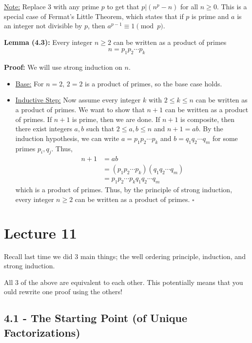 \documentclass{article}
\newcommand*{\qed}{\hfill$\square$}%
\begin{document}
\underline{Note:} Replace 3 with any prime $p$ to get that $p|(n^p-n)$ for all $n\geq 0$. This is a special case of Fermat's Little Theorem, which states that if $p$ is prime and $a$ is an integer not divisible by $p$, then $a^{p-1}\equiv 1 \pmod p$.

\textbf{Lemma (4.3):} Every integer $n\geq 2$ can be written as a product of primes \begin{align*}
    n=p_1p_2\cdots p_k
\end{align*}

\textbf{Proof:} We will use strong induction on $n$.\begin{itemize}
    \item \underline{Base:} For $n=2$, $2=2$ is a product of primes, so the base case holds.
    \item \underline{Inductive Step:} Now assume every integer $k$ with $2\leq k\leq n$ can be written as a product of primes. We want to show that $n+1$ can be written as a product of primes. If $n+1$ is prime, then we are done. If $n+1$ is composite, then there exist integers $a,b$ such that $2\leq a,b\leq n$ and $n+1=ab$. By the induction hypothesis, we can write $a=p_1p_2\cdots p_k$ and $b=q_1q_2\cdots q_m$ for some primes $p_i,q_j$. Thus, \begin{align*}
    n+1 &= ab \\
        &= (p_1p_2\cdots p_k)(q_1q_2\cdots q_m) \\
        &= p_1p_2\cdots p_k q_1q_2\cdots q_m
\end{align*}which is a product of primes. Thus, by the principle of strong induction, every integer $n\geq 2$ can be written as a product of primes. \qed
\end{itemize}

\section{Lecture 11}

Recall last time we did 3 main things; the well ordering principle, induction, and strong induction. 

All 3 of the above are equivalent to each other. This potentially means that you ould rewrite one proof using the others!

\subsection{4.1 - The Starting Point (of Unique Factorizations)}
\end{document}
